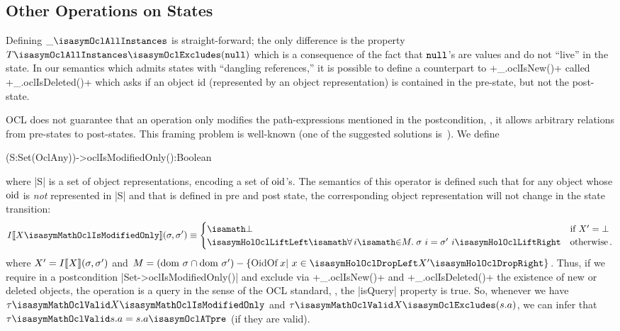 \subsection{Other Operations on States}
Defining $\_\isasymOclAllInstances$
is straight-forward; the only difference is the property
$T\isasymOclAllInstances\isasymOclExcludes(\isasymOclNull)$ which is a
consequence of the fact that ${\mathtt{null}_\text{{}}}$'s are values and do not ``live'' in the
state.  In our semantics which admits states with ``dangling references,'' it is
possible to define a counterpart to \inlineocl+_.oclIsNew()+ called
\inlineocl+_.oclIsDeleted()+ which asks if an object id (represented by an object
representation) is contained in the pre-state, but not the post-state.

OCL does not guarantee that an operation only modifies the path-expressions
mentioned in the postcondition, \ie, it allows arbitrary relations from
pre-states to post-states.  This framing problem is well-known (one of the
suggested solutions is~\cite{kosiuczenko:specification:2006}). We define
\begin{ocl}
 (S:Set(OclAny))->oclIsModifiedOnly():Boolean
\end{ocl}
where \inlineocl|S| is a set of object representations, encoding
a set of $\mathrm{oid}$'s. The semantics of this operator is defined such that
for any object whose $\mathrm{oid}$ is \emph{not }represented in \inlineocl|S|
and that is defined in pre and post state, the corresponding object representation will not change
in the state transition:
\begin{gather*}
I\semantics{X\isasymMathOclIsModifiedOnly} (\sigma, \sigma')  \equiv
  \begin{cases}
    \isasymbottom & \text{if $X' = \bottom$}  \\
     \lift{\isasymforall i \isasymin M\spot
        \sigma~i = \sigma'~i} & \text{otherwise}\mi{.}
   \end{cases}
\end{gather*}
where $X' = I\llbracket X \rrbracket (\sigma, \sigma')$ and $M=
(\dom~\sigma\cap\dom~\sigma') - \{ \HolOclOidOf x |~x \in\drop{X'}\}$.  Thus, if
we require in a postcondition \inlineocl|Set{}->oclIsModifiedOnly()| and exclude via
\inlineocl+_.oclIsNew()+ and \inlineocl+_.oclIsDeleted()+ the existence of new
or deleted objects, the operation is a query in the sense of the OCL standard, \ie,
the \inlineocl|isQuery| property is true. So, whenever we have $ \tau
\isasymMathOclValid X\isasymMathOclIsModifiedOnly$ and $ \tau
\isasymMathOclValid X\isasymOclExcludes(s.a)$, we can infer that $\tau
\isasymMathOclValid s.a = s.a\isasymOclATpre$ (if they are valid).

